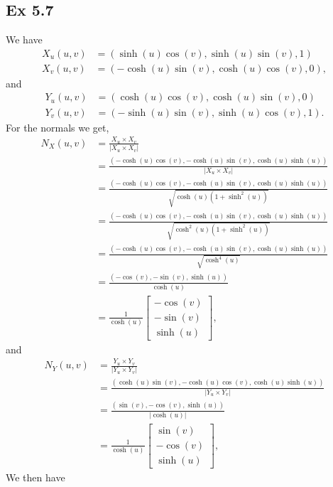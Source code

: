 \documentclass{article}
\theoremstyle{definition}
\begin{document}
\subsection*{Ex 5.7}


We have
\begin{align*}
	X_u(u, v)
	&=
	(\sinh(u)\cos(v), \sinh(u)\sin(v), 1) \\
	X_v(u, v)
	&=
	(-\cosh(u)\sin(v), \cosh(u)\cos(v), 0),
\end{align*}
and
\begin{align*}
	Y_u(u, v)
	&=
	(\cosh(u)\cos(v), \cosh(u)\sin(v), 0) \\
	Y_v(u, v)
	&=
	(-\sinh(u)\sin(v), \sinh(u)\cos(v), 1).
\end{align*}
For the normals we get,
\begin{align*}
	N_{X}(u, v)
	&=
	\frac{X_u \times X_v}{|X_u \times X_v|} \\
	&=
	\frac{(-\cosh(u)\cos(v), -\cosh(u)\sin(v), \cosh(u)\sinh(u))}{|X_u \times X_v|} \\
	&=
	\frac{(-\cosh(u)\cos(v), -\cosh(u)\sin(v), \cosh(u)\sinh(u))}{\sqrt{\cosh(u)(1 + \sinh^2(u))}} \\
	&=
	\frac{(-\cosh(u)\cos(v), -\cosh(u)\sin(v), \cosh(u)\sinh(u))}{\sqrt{\cosh^2(u)(1 + \sinh^2(u))}} \\
	&=
	\frac{(-\cosh(u)\cos(v), -\cosh(u)\sin(v), \cosh(u)\sinh(u))}{\sqrt{\cosh^4(u)}} \\
	&=
	\frac{(-\cos(v), -\sin(v), \sinh(u))}{\cosh(u)} \\
	&=
	\frac{1}{\cosh(u)}
	\begin{bmatrix}
		-\cos(v) \\
		-\sin(v) \\
		\sinh(u)
	\end{bmatrix},
\end{align*}
and
\begin{align*}
	N_{Y}(u, v)
	&=
	\frac{Y_u \times Y_v}{|Y_u \times Y_v|} \\
	&=
	\frac{(\cosh(u)\sin(v), -\cosh(u)\cos(v), \cosh(u)\sinh(u))}{|Y_u \times Y_v|} \\
	&=
	\frac{(\sin(v), -\cos(v), \sinh(u))}{|\cosh(u)|} \\
	&=
	\frac{1}{\cosh(u)}
	\begin{bmatrix}
		\sin(v) \\
		-\cos(v) \\
		\sinh(u)
	\end{bmatrix},
\end{align*}
We then have
\end{document}
